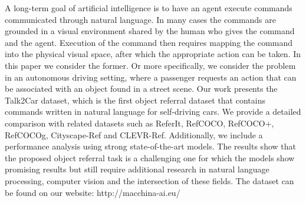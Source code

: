 A long-term goal of artificial intelligence is to have an agent execute commands communicated through natural language. In many cases the commands are grounded in a visual environment shared by the human who gives the command and the agent. Execution of the command then requires mapping the command into the physical visual space, after which the appropriate action can be taken. In this paper we consider the former. Or more specifically, we consider the problem in an autonomous driving setting, where a passenger requests an action that can be associated with an object found in a street scene. Our work presents the Talk2Car dataset, which is the first object referral dataset that contains commands written in natural language for self-driving cars. We provide a detailed comparison with related datasets such as ReferIt, RefCOCO, RefCOCO+, RefCOCOg, Cityscape-Ref and CLEVR-Ref. Additionally, we include a performance analysis using strong state-of-the-art models. The results show that the proposed object referral task is a challenging one for which the models show promising results but still require additional research in natural language processing, computer vision and the intersection of these fields. The dataset can be found on our website: http://macchina-ai.eu/
